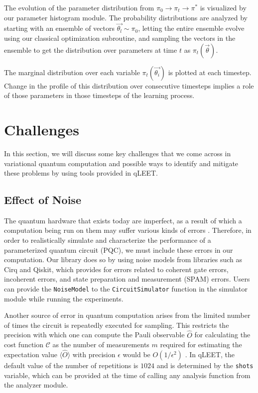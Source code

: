 \documentclass[%
 reprint,
 amsmath,
 amssymb,
 showkeys,
 pra,
 floatfix,
]{revtex4-2}
\begin{document}
The evolution of the parameter distribution from $\pi_0 \rightarrow \pi_t \rightarrow \pi^*$ is visualized by our parameter histogram module. The probability distributions are analyzed by starting with an ensemble of vectors $\vec{\theta_l} \sim \pi_0$, letting the entire ensemble evolve using our classical optimization subroutine, and sampling the vectors in the ensemble to get the distribution over parameters at time $t$ as $\pi_t(\vec{\theta})$. 

The marginal distribution over each variable $\pi_t(\vec{\theta_i})$ is plotted at each timestep. Change in the profile of this distribution over consecutive timesteps implies a role of those parameters in those timesteps of the learning process.


\section{\label{sec:challenges}Challenges}

In this section, we will discuss some key challenges that we come across in variational quantum computation and possible ways to identify and mitigate these problems by using tools provided in qLEET.

\subsection{Effect of Noise}

The quantum hardware that exists today are imperfect, as a result of which a computation being run on them may suffer various kinds of errors \cite{Chaudhary2022-kl}. Therefore, in order to realistically simulate and characterize the performance of a parameterized quantum circuit (PQC), we must include these errors in our computation. Our library does so by using noise models from libraries such as Cirq and Qiskit, which provides for errors related to coherent gate errors, incoherent errors, and state preparation and measurement (SPAM) errors. Users can provide the \texttt{NoiseModel} to the \texttt{CircuitSimulator} function in the simulator module while running the experiments. 

Another source of error in quantum computation arises from the limited number of times the circuit is repeatedly executed for sampling. This restricts the precision with which one can compute the Pauli observable $\hat{O}$ for calculating the cost function $\mathcal{C}$ as the number of measurements $m$ required for estimating the expectation value $\langle\hat{O}\rangle$ with precision $\epsilon$ would be $O(1/\epsilon^2)$ \cite{Higgott2019variationalquantum}. In qLEET, the default value of the number of repetitions is $1024$ and is determined by the \texttt{shots} variable, which can be provided at the time of calling any analysis function from the analyzer module.
\end{document}

